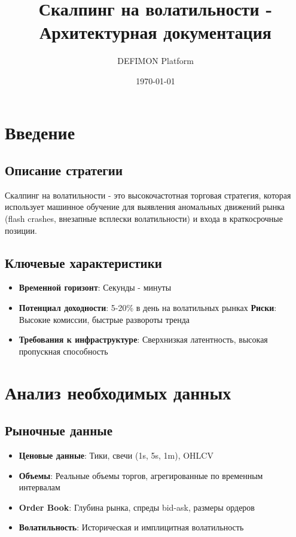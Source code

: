 \documentclass[12pt,a4paper]{article}
\title{Скалпинг на волатильности - Архитектурная документация}
\author{DEFIMON Platform}
\date{\today}
\begin{document}
\maketitle

\tableofcontents
\newpage

\section{Введение}

\subsection{Описание стратегии}
Скалпинг на волатильности - это высокочастотная торговая стратегия, которая использует машинное обучение для выявления аномальных движений рынка (flash crashes, внезапные всплески волатильности) и входа в краткосрочные позиции.

\subsection{Ключевые характеристики}
\begin{itemize}
    \item \textbf{Временной горизонт}: Секунды - минуты
    \item \textbf{Потенциал доходности}: 5-20\% в день на волатильных рынках
    \textbf{Риски}: Высокие комиссии, быстрые развороты тренда
    \item \textbf{Требования к инфраструктуре}: Сверхнизкая латентность, высокая пропускная способность
\end{itemize}

\section{Анализ необходимых данных}

\subsection{Рыночные данные}
\begin{itemize}
    \item \textbf{Ценовые данные}: Тики, свечи (1s, 5s, 1m), OHLCV
    \item \textbf{Объемы}: Реальные объемы торгов, агрегированные по временным интервалам
    \item \textbf{Order Book}: Глубина рынка, спреды bid-ask, размеры ордеров
    \item \textbf{Волатильность}: Историческая и имплицитная волатильность
\end{itemize}
\end{document}
